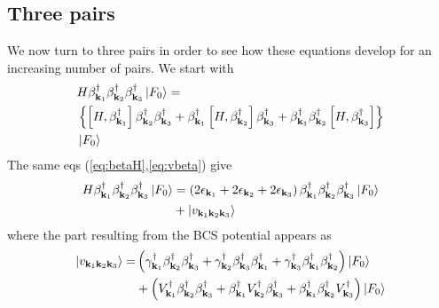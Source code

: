 \documentclass[aps,prb,superscriptaddress,twocolumn]{revtex4}
\begin{document}
\subsection{Three pairs}

We now turn to three pairs in order to see how these equations develop for an
increasing number of pairs. We start with 
\begin{equation}  \label{eq:SchThree}
\begin{split}
&H\beta^{\dagger}_{\mathbf{k} _1}\beta^{\dagger}_{\mathbf{k}
_2}\beta^{\dagger}_{\mathbf{k} _3}\left|F_0\right>   = \\
&\left\{\left[H,\beta^{\dagger}_{\mathbf{k} _1}\right]  \beta^{\dagger}_{%
\mathbf{k} _2}\beta^{\dagger}_{\mathbf{k} _3}+\beta^{\dagger}_{\mathbf{k} _1}%
\left[H,\beta^{\dagger}_{\mathbf{k} _2}\right]  \beta^{\dagger}_{\mathbf{k}
_3}+\beta^{\dagger}_{\mathbf{k} _1}\beta^{\dagger}_{\mathbf{k} _2}\left[%
H,\beta^{\dagger}_{\mathbf{k} _3}\right]  \right\}  \\
&\left|F_0\right>   \\
\end{split}%
\end{equation}
The same eqs (\ref{eq:betaH},\ref{eq:vbeta}) give 
\begin{equation}  \label{eq:SchThree2}
\begin{split}
H\beta^{\dagger}_{\mathbf{k} _1}\beta^{\dagger}_{\mathbf{k}
_2}\beta^{\dagger}_{\mathbf{k} _3}\left|F_0\right>   &=\left(2\epsilon_{%
\mathbf{k} _1}+2\epsilon_{\mathbf{k} _2}+2\epsilon_{\mathbf{k} _3}\right)
\beta^{\dagger}_{\mathbf{k} _1}\beta^{\dagger}_{\mathbf{k}
_2}\beta^{\dagger}_{\mathbf{k} _3}\left|F_0\right>   \\
&+\left|v_{\mathbf{k} _1\mathbf{k} _2\mathbf{k} _3}\right> 
\end{split}%
\end{equation}
where the part resulting from the BCS potential appears as 
\begin{equation}  \label{eq:vThree}
\begin{split}
\left|v_{\mathbf{k} _1\mathbf{k} _2\mathbf{k} _3}\right> =
&\left(\gamma^{\dagger}_{\mathbf{k} _1}\beta^{\dagger}_{\mathbf{k}
_2}\beta^{\dagger}_{\mathbf{k} _3}+\gamma^{\dagger}_{\mathbf{k}
_2}\beta^{\dagger}_{\mathbf{k} _3}\beta^{\dagger}_{\mathbf{k}
_1}+\gamma^{\dagger}_{\mathbf{k} _3}\beta^{\dagger}_{\mathbf{k}
_1}\beta^{\dagger}_{\mathbf{k} _2}\right) \left|F_0\right>   \\
&+\left(V^{\dagger}_{\mathbf{k} _1}\beta^{\dagger}_{\mathbf{k}
_2}\beta^{\dagger}_{\mathbf{k} _3}+\beta^{\dagger}_{\mathbf{k}
_1}V^{\dagger}_{\mathbf{k} _2}\beta^{\dagger}_{\mathbf{k} _3}+\beta^{%
\dagger}_{\mathbf{k} _1}\beta^{\dagger}_{\mathbf{k} _2}V^{\dagger}_{\mathbf{k%
} _3}\right) \left|F_0\right>  
\end{split}%
\end{equation}
\end{document}
